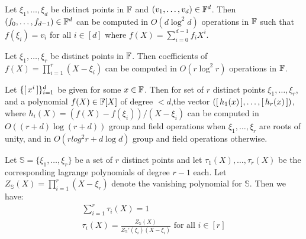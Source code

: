 \begin{fact}\label{fc:ifft}
Let $\xi_1,\ldots,\xi_d$ be distinct points in $\mathbb{F}$ and $(v_1,\ldots,v_d)\in \mathbb{F}^d$. Then $(f_0,\ldots,f_{d-1})\in \mathbb{F}^d$
can be computed in $O(d\log^2 d)$ operations in $\mathbb{F}$ such that $f(\xi_i)=v_i$ for all $i\in [d]$ where
$f(X)=\sum_{i=0}^{d-1}f_iX^i$.
\end{fact}

\begin{fact}\label{fc:mult}
Let $\xi_1,\ldots,\xi_r$ be distinct points in $\mathbb{F}$. Then coefficients of $f(X)=\prod_{i=1}^r (X-\xi_i)$
can be computed in $O(r\log^2 r)$ operations in $\mathbb{F}$.
\end{fact}

\begin{fact}\label{fc:multkzg}
Let $\{[\,{x^i}\,]\}_{i=1}^d$ be given for some $x\in \mathbb{F}$. Then for set of $r$ distinct points $\xi_1,\ldots,\xi_r$,
and a polynomial $f(X)\in \mathbb{F}[X]$ of degree $<d$,the vector $([\,{h_1(x)}\,],\ldots,[\,{h_r(x)}\,])$,
where $h_i(X) = (f(X) - f(\xi_i))/(X - \xi_i)$ can be computed in
$O((r+d)\log(r+d))$ group and field operations when $\xi_1,\ldots,\xi_r$ are roots of unity, and in
$O(rlog^2 r + d\log d)$ group and field operations otherwise.
\end{fact}

\begin{fact}\label{fc:lagrange}
Let $\mathbb{S}=\{\xi_1,\ldots,\xi_r\}$ be a set of $r$ distinct points and let $\tau_1(X),\ldots,\tau_r(X)$ be
the corresponding lagrange polynomials of degree $r-1$ each. Let $Z_{\mathbb{S}}(X)=\prod_{i=1}^r (X-\xi_r)$ denote the vanishing polynomial
for $\mathbb{S}$. Then we have:
\begin{gather*}
    \sum_{i=1}^r \tau_i(X) = 1 \\
    \tau_i(X) = \frac{Z_{\mathbb{S}}(X)}{Z_{\mathbb{S}}'(\xi_i)(X-\xi_i)} \text{ for all } i\in [r]
\end{gather*}
\end{fact}

